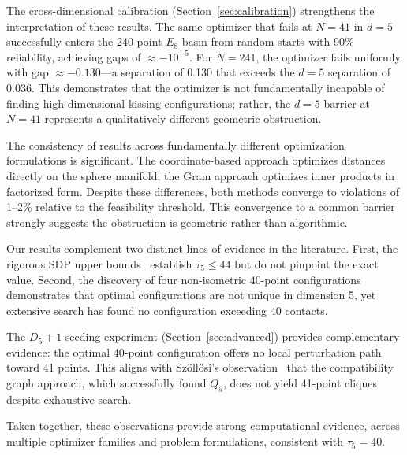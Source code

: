 \documentclass[11pt]{article}
\begin{document}
The cross-dimensional calibration (Section~\ref{sec:calibration}) strengthens the interpretation of these results. The same optimizer that fails at $N=41$ in $d=5$ successfully enters the 240-point $E_8$ basin from random starts with 90\% reliability, achieving gaps of $\approx -10^{-5}$. For $N=241$, the optimizer fails uniformly with gap $\approx -0.130$---a separation of 0.130 that exceeds the $d=5$ separation of 0.036. This demonstrates that the optimizer is not fundamentally incapable of finding high-dimensional kissing configurations; rather, the $d=5$ barrier at $N=41$ represents a qualitatively different geometric obstruction.

The consistency of results across fundamentally different optimization formulations is significant. The coordinate-based approach optimizes distances directly on the sphere manifold; the Gram approach optimizes inner products in factorized form. Despite these differences, both methods converge to violations of 1--2\% relative to the feasibility threshold. This convergence to a common barrier strongly suggests the obstruction is geometric rather than algorithmic.

Our results complement two distinct lines of evidence in the literature. First, the rigorous SDP upper bounds~\cite{BachocVallentin2008,MittelmannVallentin2010} establish $\tau_5 \le 44$ but do not pinpoint the exact value. Second, the discovery of four non-isometric 40-point configurations~\cite{Leech1967,Szollosi2023,CohnRajagopal2024} demonstrates that optimal configurations are not unique in dimension 5, yet extensive search has found no configuration exceeding 40 contacts.

The $D_5+1$ seeding experiment (Section~\ref{sec:advanced}) provides complementary evidence: the optimal 40-point configuration offers no local perturbation path toward 41 points. This aligns with Sz\"{o}ll\H{o}si's observation~\cite{Szollosi2023} that the compatibility graph approach, which successfully found $Q_5$, does not yield 41-point cliques despite exhaustive search.

Taken together, these observations provide strong computational evidence, across multiple optimizer families and problem formulations, consistent with $\tau_5=40$.
\end{document}
